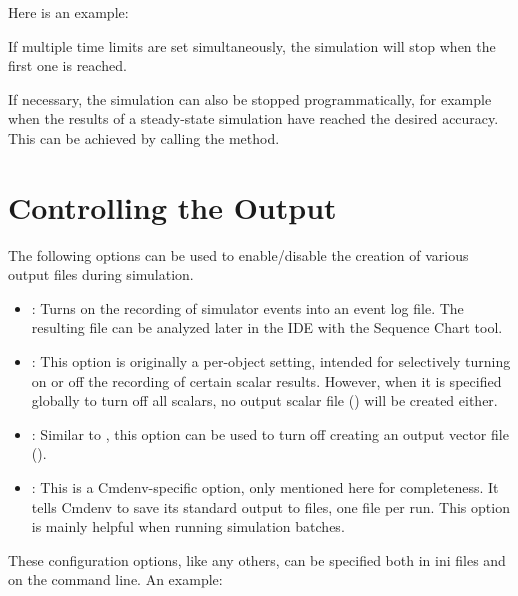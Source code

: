 Here is an example:


If multiple time limits are set simultaneously, the simulation will stop when
the first one is reached.

If necessary, the simulation can also be stopped programmatically, for example
when the results of a steady-state simulation have reached the desired accuracy.
This can be achieved by calling the  method.


\section{Controlling the Output}
\label{sec:run-sim:output-control}

The following options can be used to enable/disable the creation of various
output files during simulation.

\begin{itemize}
  \item {} : Turns on the recording of simulator
        events into an event log file. The resulting  file can be
        analyzed later in the IDE with the Sequence Chart tool.

  \item {} : This option is originally a
        per-object setting, intended for selectively turning on or off the
        recording of certain scalar results. However, when it is specified
        globally to turn off all scalars, no output scalar file
        () will be created either.

  \item {} : Similar to ,
        this option can be used to turn off creating an output vector file
        ().

  \item {} : This is a Cmdenv-specific option,
        only mentioned here for completeness. It tells Cmdenv to save its
        standard output to files, one file per run. This option is mainly
        helpful when running simulation batches.

\end{itemize}

These configuration options, like any others, can be specified both in ini
files and on the command line. An example:

